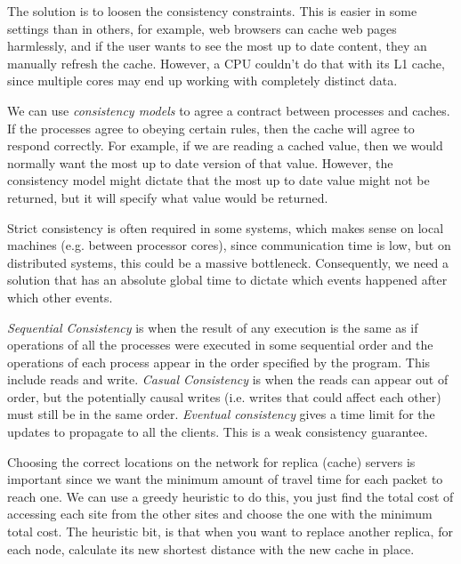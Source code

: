 The solution is to loosen the consistency constraints. This is easier in some
settings than in others, for example, web browsers can cache web pages
harmlessly, and if the user wants to see the most up to date content, they an
manually refresh the cache. However, a CPU couldn't do that with its L1 cache,
since multiple cores may end up working with completely distinct data.

We can use \textit{consistency models} to agree a contract between processes and
caches. If the processes agree to obeying certain rules, then the cache will
agree to respond correctly. For example, if we are reading a cached value, then
we would normally want the most up to date version of that value. However, the
consistency model might dictate that the most up to date value might not be
returned, but it will specify what value would be returned.

Strict consistency is often required in some systems, which makes sense on local
machines (e.g. between processor cores), since communication time is low, but on
distributed systems, this could be a massive bottleneck. Consequently, we need a
solution that has an absolute global time to dictate which events happened after
which other events.

\textit{Sequential Consistency} is when the result of any execution is the same
as if operations of all the processes were executed in some sequential order and
the operations of each process appear in the order specified by the program.
This include reads and write. \textit{Casual Consistency} is when the reads can
appear out of order, but the potentially causal writes (i.e. writes that could
affect each other) must still be in the same order. \textit{Eventual
consistency} gives a time limit for the updates to propagate to all the clients.
This is a weak consistency guarantee.

Choosing the correct locations on the network for replica (cache) servers is
important since we want the minimum amount of travel time for each packet to
reach one. We can use a greedy heuristic to do this, you just find the total
cost of accessing each site from the other sites and choose the one with the
minimum total cost. The heuristic bit, is that when you want to replace another
replica, for each node, calculate its new shortest distance with the new cache
in place.
